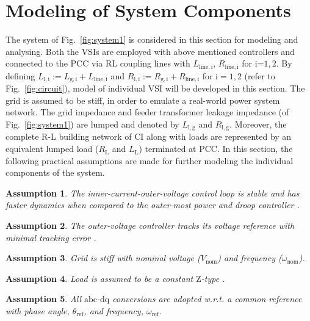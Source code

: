 \documentclass[journal]{IEEEtran}
\newtheorem{assumption}{Assumption}
\begin{document}
\section{Modeling of System Components}\label{model}
The system of Fig.~\ref{fig:system1} is considered in this section for modeling and analysing. Both the VSIs are employed with above mentioned controllers and connected to the PCC via $\mathrm{RL}$ coupling lines with $L_\mathrm{line,i}$, $R_\mathrm{line,i}$ for $\mathrm{i}$=$1,2$. By defining $L_\mathrm{l,i}:=L_\mathrm{g,i}+L_\mathrm{line,i}$ and $R_\mathrm{l,i}:=R_\mathrm{g,i}+R_\mathrm{line,i}$ for $\mathrm{i}=1,2$ (refer to Fig.~\ref{fig:circuit}), model of individual VSI will be developed in this section. The grid is assumed to be stiff, in order to emulate a real-world power system network. The grid impedance and feeder transformer leakage impedance (of Fig.~\ref{fig:system1}) are lumped and denoted by $L_\mathrm{l,g}$ and $R_\mathrm{l,g}$. Moreover, the complete R-L building network of CI along with loads are represented by an equivalent lumped load ($R_\mathrm{L}$ and $L_\mathrm{L}$) terminated at PCC. In this section, the following practical assumptions are made for further modeling the individual components of the system.
\begin{assumption}\label{assumption1}
The inner-current-outer-voltage control loop is stable and has faster dynamics when compared to the outer-most power and droop controller \cite{reduce1,iravani}.
\end{assumption}
\begin{assumption}\label{assumption2}
The outer-voltage controller tracks its voltage reference with minimal tracking error \cite{iravani}.
\end{assumption}
\begin{assumption}\label{assumption3}
Grid is stiff with nominal voltage ($V_\mathrm{nom}$) and frequency ($\omega_\mathrm{nom}$). 
\end{assumption}
\begin{assumption}\label{assumption4}
Load is assumed to be a constant $\mathrm{Z}$-type \cite{kundur}.
\end{assumption}
\begin{assumption}\label{assumption5}
All $\mathrm{abc}$-$\mathrm{dq}$ conversions are adopted w.r.t. a common reference with phase angle, $\theta_\mathrm{ref}$, and frequency, $\omega_\mathrm{ref}$.
\end{assumption}
\end{document}
